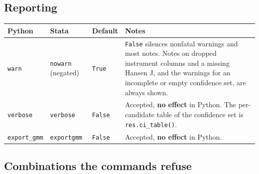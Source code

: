 \documentclass[
  10.5pt,
  a4paper,
]{article}
\newcounter{none} %
\begin{document}
\subsection{Reporting}\label{reporting}

{\def\LTcaptype{none} %
\begin{longtable}[]{@{}
  >{\raggedright\arraybackslash}p{}
  >{\raggedright\arraybackslash}p{}
  >{\raggedright\arraybackslash}p{}
  >{\raggedright\arraybackslash}p{}@{}}
\toprule\noalign{}
\begin{minipage}[b]{\linewidth}\raggedright
Python
\end{minipage} & \begin{minipage}[b]{\linewidth}\raggedright
Stata
\end{minipage} & \begin{minipage}[b]{\linewidth}\raggedright
Default
\end{minipage} & \begin{minipage}[b]{\linewidth}\raggedright
Notes
\end{minipage} \\
\midrule\noalign{}
\endhead
\bottomrule\noalign{}
\endlastfoot
\texttt{warn} & \texttt{nowarn} (negated) & \texttt{True} &
\texttt{False} silences nonfatal warnings and most notes. Notes on
dropped instrument columns and a missing Hansen J, and the warnings for
an incomplete or empty confidence set, are always shown. \\
\texttt{verbose} & \texttt{verbose} & \texttt{False} & Accepted,
\textbf{no effect} in Python. The per-candidate table of the confidence
set is \texttt{res.ci\_table()}. \\
\texttt{export\_gmm} & \texttt{exportgmm} & \texttt{False} & Accepted,
\textbf{no effect} in Python. \\
\end{longtable}
}

\subsection{Combinations the commands
refuse}\label{combinations-the-commands-refuse}
\end{document}
